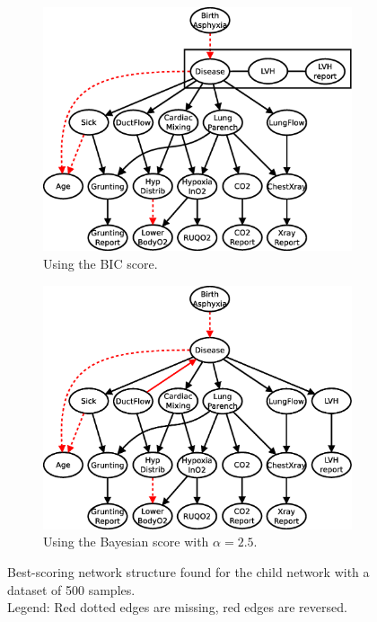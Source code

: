 \documentclass[english,cover]{fitthesis} %
\begin{document}
\begin{figure}[ht]
    \centering
    \begin{subfigure}[b]{0.45\linewidth}
        \hspace{-2.3cm}
        \includegraphics[scale=0.37]{fig/structure-learning-child-500-bic}
        \caption{Using the BIC score.}
        \label{fig:structure-learning-child-500-bic}
    \end{subfigure}
    \begin{subfigure}[b]{0.45\linewidth}
        \hspace{-0.5cm}
        \includegraphics[scale=0.37]{fig/structure-learning-child-500-bayes-2_5}
        \caption{Using the Bayesian score with $\alpha = 2.5$.}
        \label{fig:structure-learning-child-500-bayes-2_5}
    \end{subfigure}
    \caption{Best-scoring network structure found for the child network with a dataset of 500 samples.
    \\Legend: Red dotted edges are missing, red edges are reversed.}
\end{figure}
\end{document}
